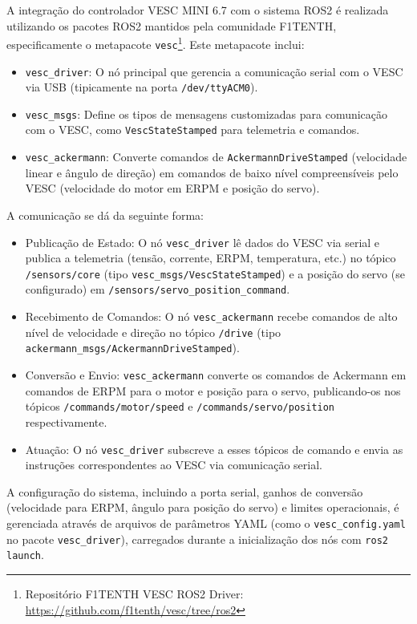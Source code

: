 A integração do controlador VESC MINI 6.7 com o sistema ROS2 é realizada
utilizando os pacotes ROS2 mantidos pela comunidade F1TENTH, especificamente o
metapacote \texttt{vesc}\footnote{Repositório F1TENTH VESC ROS2 Driver:
      \url{https://github.com/f1tenth/vesc/tree/ros2}}. Este metapacote inclui:
\begin{itemize}
      \item \texttt{vesc\_driver}: O nó principal que gerencia a comunicação serial com o
            VESC via USB (tipicamente na porta \texttt{/dev/ttyACM0}).
      \item \texttt{vesc\_msgs}: Define os tipos de mensagens customizadas para
            comunicação com o VESC, como \texttt{VescStateStamped} para telemetria e
            comandos.
      \item \texttt{vesc\_ackermann}: Converte comandos de \texttt{AckermannDriveStamped} (velocidade
            linear e ângulo de direção) em comandos de baixo nível compreensíveis pelo
            VESC (velocidade do motor em ERPM e posição do servo).
\end{itemize}

A comunicação se dá da seguinte forma:
\begin{itemize}
      \item Publicação de Estado: O nó \texttt{vesc\_driver} lê dados do VESC via serial e
            publica a telemetria (tensão, corrente, ERPM, temperatura, etc.) no tópico
            \texttt{/sensors/core} (tipo \texttt{vesc\_msgs/VescStateStamped}) e a posição
            do servo (se configurado) em \texttt{/sensors/servo\_position\_command}.
      \item Recebimento de Comandos: O nó \texttt{vesc\_ackermann} recebe comandos de alto
            nível de velocidade e direção no tópico \texttt{/drive} (tipo
            \texttt{ackermann\_msgs/AckermannDriveStamped}).
      \item Conversão e Envio: \texttt{vesc\_ackermann} converte os comandos de Ackermann
            em comandos de ERPM para o motor e posição para o servo, publicando-os nos
            tópicos \texttt{/commands/motor/speed} e \texttt{/commands/servo/position}
            respectivamente.
      \item Atuação: O nó \texttt{vesc\_driver} subscreve a esses tópicos de comando e
            envia as instruções correspondentes ao VESC via comunicação serial.
\end{itemize}

A configuração do sistema, incluindo a porta serial, ganhos de conversão
(velocidade para ERPM, ângulo para posição do servo) e limites operacionais, é
gerenciada através de arquivos de parâmetros YAML (como o
\texttt{vesc\_config.yaml} no pacote \texttt{vesc\_driver}), carregados durante
a inicialização dos nós com \texttt{ros2 launch}.

